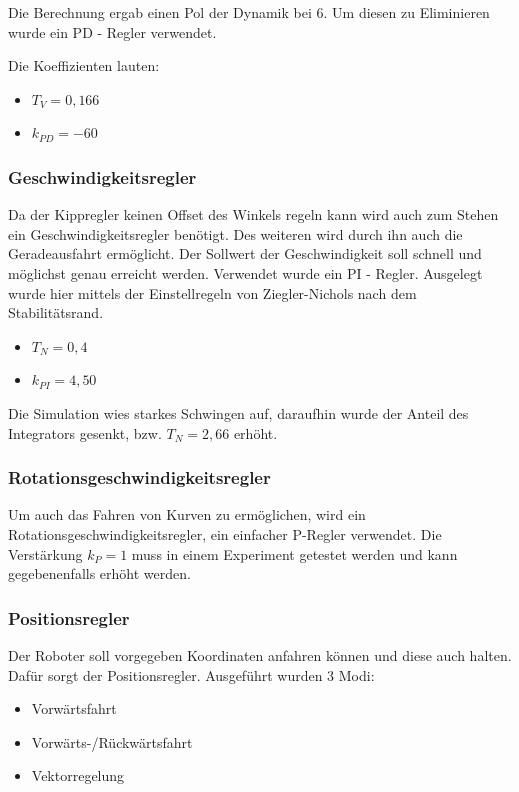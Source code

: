 Die Berechnung ergab einen Pol der Dynamik bei $6$. Um diesen zu Eliminieren wurde ein PD - Regler verwendet.

Die Koeffizienten lauten:
\begin{itemize}
	\item $ T_{V}=0,166$
	\item $ k_{PD}=-60$
\end{itemize}
\subsubsection{Geschwindigkeitsregler}
Da der Kippregler keinen Offset des Winkels regeln kann wird auch zum Stehen ein Geschwindigkeitsregler benötigt. Des weiteren wird durch ihn auch die Geradeausfahrt ermöglicht. Der Sollwert der Geschwindigkeit soll schnell und möglichst genau erreicht werden.
Verwendet wurde ein PI - Regler. Ausgelegt wurde hier mittels der Einstellregeln von Ziegler-Nichols nach dem Stabilitätsrand.
\begin{itemize}
	\item $ T_{N}=0,4$
	\item $ k_{PI}=4,50$
\end{itemize}
Die Simulation wies starkes Schwingen auf, daraufhin wurde der Anteil des Integrators gesenkt, bzw. $ T_{N}=2,66$ erhöht.
\subsubsection{Rotationsgeschwindigkeitsregler}
Um auch das Fahren von Kurven zu ermöglichen, wird ein Rotationsgeschwindigkeitsregler, ein einfacher P-Regler verwendet. Die Verstärkung $k_{P}=1$ muss in einem Experiment getestet werden und kann gegebenenfalls erhöht werden.
\subsubsection{Positionsregler}
Der Roboter soll vorgegeben Koordinaten anfahren können und  diese auch halten. Dafür sorgt der Positionsregler. Ausgeführt wurden 3 Modi:
\begin{itemize}
	\item Vorwärtsfahrt
	\item Vorwärts-/Rückwärtsfahrt
	\item Vektorregelung
\end{itemize}

